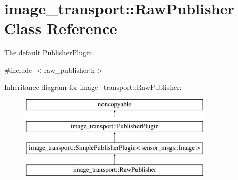 \hypertarget{classimage__transport_1_1_raw_publisher}{\section{image\-\_\-transport\-:\-:Raw\-Publisher Class Reference}
\label{classimage__transport_1_1_raw_publisher}
}


The default \hyperlink{classimage__transport_1_1_publisher_plugin}{Publisher\-Plugin}.  




{\ttfamily \#include $<$raw\-\_\-publisher.\-h$>$}

Inheritance diagram for image\-\_\-transport\-:\-:Raw\-Publisher\-:\begin{figure}[H]
\begin{center}
\leavevmode
\includegraphics[height=4.000000cm]{classimage__transport_1_1_raw_publisher}
\end{center}
\end{figure}
